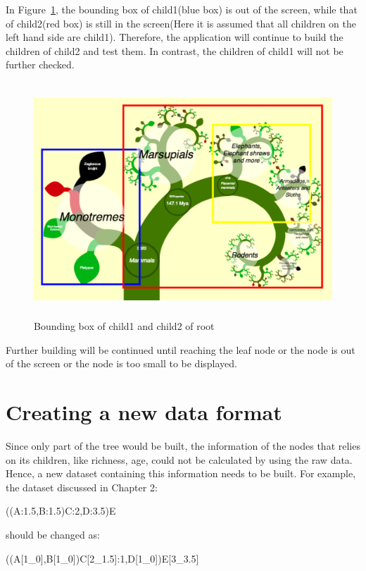 \documentclass[a4paper,11pt,twoside]{report}
\begin{document}
In Figure~\ref{fig:screenAndBounding2}, the bounding box of child1(blue box) is out of the screen, while that of child2(red box) is still in the screen(Here it is assumed that all children on the left hand side are child1). Therefore, the application will continue to build the children of child2 and test them. In contrast, the children of child1 will not be further checked. 

\begin{figure}[H]
  \centering
  \includegraphics [width=15cm,height=8.8cm]{ScreenAndBounding2}
  \caption{Bounding box of child1 and child2 of root}
  \label{fig:screenAndBounding2}
\end{figure}

Further building will be continued until reaching the leaf node or the node is out of the screen or the node is too small to be displayed.



\section{Creating a new data format}

Since only part of the tree would be built, the information of the nodes that relies on its children, like richness, age, could not be calculated by using the raw data. Hence, a new dataset containing this information needs to be built. For example, the dataset discussed in Chapter 2: 

\begin{center}
	((A:1.5,B:1.5)C:2,D:3.5)E
\end{center}

should be changed as:

\begin{center}
	((A[1\_0],B[1\_0])C[2\_1.5]:1,D[1\_0])E[3\_3.5]
\end{center}
\end{document}

